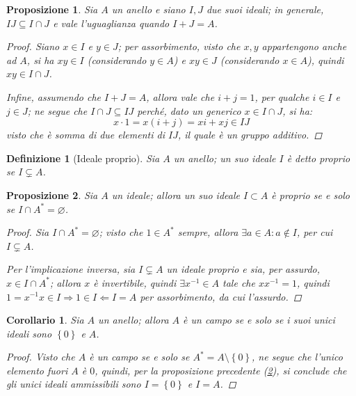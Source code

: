 \documentclass[12pt]{scrartcl}
\theoremstyle{style}
\newtheorem{definizione}{Definizione}[section]
\newtheorem{prop}{Proposizione}[section]
\newtheorem{corollario}{Corollario}[teorema]
\numberwithin{equation}{subsection}
\begin{document}
\begin{prop}
	Sia $A$ un anello e siano $I,J$ due suoi ideali; in generale, $IJ\subseteq  I\cap J$ e vale l'uguaglianza quando $I+J = A$.
	\begin{proof}
		Siano $x \in I$ e $y \in J$; per assorbimento, visto che $x,y$ appartengono anche ad $A$, si ha $xy \in I$ (considerando $y \in A$) e $xy \in J$ (considerando $x \in A$), quindi $xy \in I\cap J$.

		Infine, assumendo che $I + J = A$, allora vale che $i + j = 1$, per qualche $i \in I$ e $j \in J$; ne segue che $I\cap J \subseteq IJ$ perch\'e, dato un generico $x \in I\cap J$, si ha:
		\[
		x \cdot 1 = x (i + j) = xi  + xj \in IJ
		\] 
		visto che \`e somma di due elementi di $IJ$, il quale \`e un gruppo additivo.
	\end{proof}
\end{prop}
\begin{definizione}
	[Ideale proprio]
	Sia $A$ un anello; un suo ideale $I$ \`e detto \textit{proprio} se $I \subsetneq A$.
\end{definizione}
\begin{prop}\label{idprop}
	Sia $A$ un ideale; allora un suo ideale $I \subset A$ \`e proprio se e solo se $I \cap A^* = \varnothing$.
	\begin{proof}
		Sia $I\cap A^* = \varnothing$; visto che $1 \in A^*$ sempre, allora $\exists a \in A : a \not\in I$, per cui $I \subsetneq A$.

		Per l'implicazione inversa, sia $I \subsetneq A$ un ideale proprio e sia, per assurdo, $x \in I \cap A^*$; allora $x$ \`e invertibile, quindi $\exists x^{-1} \in A$ tale che $x x^{-1} = 1$, quindi $1= x^{-1} x \in I \Rightarrow 1 \in I \Leftarrow I = A$ per assorbimento, da cui l'assurdo.
	\end{proof}
\end{prop}
\begin{corollario}
	Sia $A$ un anello; allora $A$ \`e un campo se e solo se i suoi unici ideali sono $\left\{ 0 \right\} $ e $A$.
	\begin{proof}
		Visto che $A$ \`e un campo se e solo se $A^* = A \setminus\left\{ 0 \right\} $, ne segue che l'unico elemento fuori $A$ \`e $0$, quindi, per la proposizione precedente (\ref{idprop}), si conclude che gli unici ideali ammissibili sono $I=\left\{ 0 \right\} $ e $I=A$.
	\end{proof}
\end{corollario}
\end{document}
